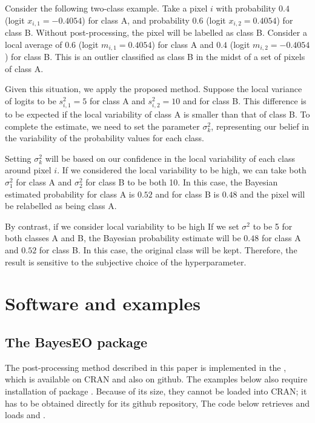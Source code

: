 \documentclass[
  shortnames]{jss}
\begin{document}
Consider the following two-class example. Take a pixel \(i\) with probability \(0.4\) (logit \(x_{i,1} = -0.4054\)) for class A, and probability \(0.6\) (logit \(x_{i,2} = 0.4054\)) for class B. Without post-processing, the pixel will be labelled as class B. Consider a local average of \(0.6\) (logit \(m_{i,1} = 0.4054\)) for class A and \(0.4\) (logit \(m_{i,2} = -0.4054\)) for class B. This is an outlier classified as class B in the midst of a set of pixels of class A.

Given this situation, we apply the proposed method. Suppose the local variance of logits to be \(s^2_{i,1} = 5\) for class A and \(s^2_{i,2} = 10\) and for class B. This difference is to be expected if the local variability of class A is smaller than that of class B. To complete the estimate, we need to set the parameter \(\sigma^2_{k}\), representing our belief in the variability of the probability values for each class.

Setting \(\sigma^2_{k}\) will be based on our confidence in the local variability of each class around pixel \({i}\). If we considered the local variability to be high, we can take both \(\sigma^2_1\) for class A and \(\sigma^2_2\) for class B to be both 10. In this case, the Bayesian estimated probability for class A is \(0.52\) and for class B is \(0.48\) and the pixel will be relabelled as being class A.

By contrast, if we consider local variability to be high If we set \(\sigma^2\) to be 5 for both classes A and B, the Bayesian probability estimate will be \(0.48\) for class A and \(0.52\) for class B. In this case, the original class will be kept. Therefore, the result is sensitive to the subjective choice of the hyperparameter.

\hypertarget{software-and-examples}{%
\section{Software and examples}\label{software-and-examples}}

\hypertarget{the-bayeseo-package}{%
\subsection{The BayesEO package}\label{the-bayeseo-package}}

The post-processing method described in this paper is implemented in the  , which is available on CRAN and also on github. The examples below also require installation of package . Because of its size, they cannot be loaded into CRAN; it has to be obtained directly for its github repository, The code below retrieves and loads  and .
\end{document}
